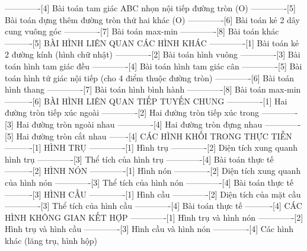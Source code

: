 -------------[4] Bài toán tam giác ABC nhọn nội tiếp đường tròn (O)
-------------[5] Bài toán dựng thêm đường tròn thứ hai khác (O)
-------------[6] Bài toán kẻ 2 dây cung vuông góc
-------------[7] Bài toán max-min
-------------[8] Bài toán khác
----------[5] BÀI HÌNH LIÊN QUAN CÁC HÌNH KHÁC
-------------[1] Bài toán kẻ 2 đường kính (hình chữ nhật)
-------------[2] Bài toán hình vuông
-------------[3] Bài toán hình tam giác đều
-------------[4] Bài toán hình tam giác cân
-------------[5] Bài toán hình tứ giác nội tiếp (cho 4 điểm thuộc đường tròn)
-------------[6] Bài toán hình thang
-------------[7] Bài toán hình bình hành
-------------[8] Bài toán max-min
----------[6] BÀI HÌNH LIÊN QUAN TIẾP TUYẾN CHUNG
-------------[1] Hai đường tròn tiếp xúc ngoài
-------------[2] Hai đường tròn tiếp xúc trong
-------------[3] Hai đường tròn ngoài nhau
-------------[4] Hai đường tròn đựng nhau
-------------[5] Hai đường tròn cắt nhau
-------[4] CÁC HÌNH KHỐI TRONG THỰC TIỄN
----------[1] HÌNH TRỤ
-------------[1] Hình trụ
-------------[2] Diện tích xung quanh hình trụ
-------------[3] Thể tích của hình trụ
-------------[4] Bài toán thực tế
----------[2] HÌNH NÓN
-------------[1] Hình nón
-------------[2] Diện tích xung quanh của hình nón
-------------[3] Thể tích của hình nón
-------------[4] Bài toán thực tế
----------[3] HÌNH CẦU
-------------[1] Hình cầu
-------------[2] Diện tích của mặt cầu
-------------[3] Thể tích của hình cầu
-------------[4] Bài toán thực tế
----------[4] CÁC HÌNH KHÔNG GIAN KẾT HỢP
-------------[1] Hình trụ và hình nón
-------------[2] Hình trụ và hình cầu
-------------[3] Hình cầu và hình nón
-------------[4] Các hình khác (lăng trụ, hình hộp)
